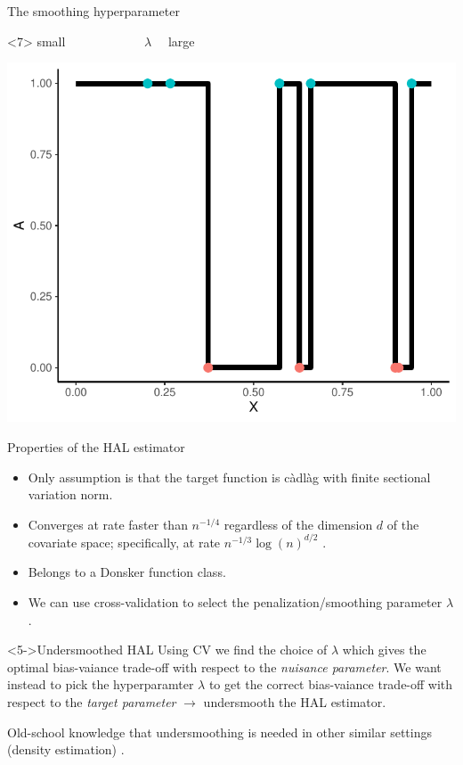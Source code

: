 \documentclass[smaller]{beamer}\usepackage{listings}
\begin{document}
\begin{frame}[label={sec:org990e36d}]{The smoothing hyperparameter}
\begin{onlyenv}<7>
\center small \(\quad \quad \quad \quad \quad \quad   \lambda \quad\) large

\begin{center}
\includegraphics[width=.9\linewidth]{./hal-smoothing5.pdf}
\end{center}
\end{onlyenv}
\end{frame}

\begin{frame}[label={sec:orged9d0c1}]{Properties of the HAL estimator}
\begin{itemize}[<+->]
\item Only assumption is that the target function is càdlàg with finite sectional variation norm.
\item Converges at rate faster than \(n^{-1/4}\) regardless of the dimension \(d\) of the covariate
space; specifically, at rate \(n^{-1/3} \log(n)^{d/2}\) \citep{van2017uniform,van2017generally}.
\item Belongs to a Donsker function class.
\item We can use cross-validation to select the penalization/smoothing parameter \(\lambda\).
\end{itemize}

\begin{block}<5->{Undersmoothed HAL}
Using CV we find the choice of \(\lambda\) which gives the optimal bias-vaiance trade-off with
respect to the \emph{nuisance parameter}. \pause We want instead to pick the hyperparamter \(\lambda\)
to get the correct bias-vaiance trade-off with respect to the \emph{target parameter} \pause
\(\rightarrow\) undersmooth the HAL estimator.

\hfill

\pause Old-school knowledge that undersmoothing is needed in other similar settings (density
estimation)
\citep{laurent1996efficient,goldstein1996efficient,bickel2003nonparametric,goldstein1992optimal}.
\end{block}
\end{frame}
\end{document}
